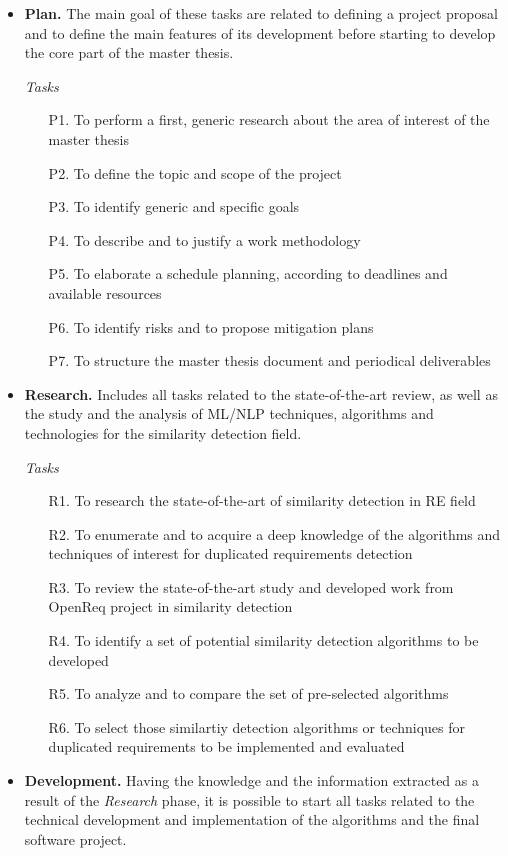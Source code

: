 \documentclass[11pt]{article}
\begin{document}
\begin{itemize}
\item \textbf{Plan.} The main goal of these tasks are related to defining a project proposal and to define the main features of its development before starting to develop the core part of the master thesis.

\textit{Tasks}
\begin{enumerate}
\item[P1.] To perform a first, generic research about the area of interest of the master thesis
\item[P2.] To define the topic and scope of the project
\item[P3.] To identify generic and specific goals
\item[P4.] To describe and to justify a work methodology
\item[P5.] To elaborate a schedule planning, according to deadlines and available resources
\item[P6.] To identify risks and to propose mitigation plans
\item[P7.] To structure the master thesis document and periodical deliverables
\end{enumerate}
\item \textbf{Research.} Includes all tasks related to the state-of-the-art review, as well as the study and the analysis of ML/NLP techniques, algorithms and technologies for the similarity detection field.

\textit{Tasks}
\begin{enumerate}
\item[R1.] To research the state-of-the-art of similarity detection in RE field
\item[R2.] To enumerate and to acquire a deep knowledge of the algorithms and techniques of interest for duplicated requirements detection
\item[R3.] To review the state-of-the-art study and developed work from OpenReq project in similarity detection
\item[R4.] To identify a set of potential similarity detection algorithms to be developed 
\item[R5.] To analyze and to compare the set of pre-selected algorithms
\item[R6.] To select those similartiy detection algorithms or techniques for duplicated requirements to be implemented and evaluated
\end{enumerate}
\item \textbf{Development.} Having the knowledge and the information extracted as a result of the \textit{Research} phase, it is possible to start all tasks related to the technical development and implementation of the algorithms and the final software project.


\end{itemize}
\end{document}

